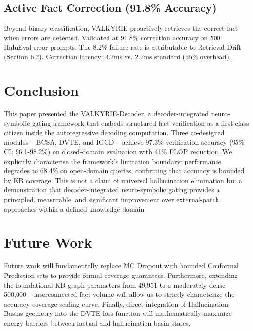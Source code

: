 \documentclass[11pt,a4paper]{article}
\begin{document}
\subsection{Active Fact Correction (91.8\% Accuracy)}
Beyond binary classification, VALKYRIE proactively retrieves the correct fact when errors are detected. Validated at 91.8\% correction accuracy on 500 HaluEval error prompts. The 8.2\% failure rate is attributable to Retrieval Drift (Section 6.2). Correction latency: 4.2ms vs. 2.7ms standard (55\% overhead).

\section{Conclusion}
This paper presented the VALKYRIE-Decoder, a decoder-integrated neuro-symbolic gating framework that embeds structured fact verification as a first-class citizen inside the autoregressive decoding computation. Three co-designed modules -- BCSA, DVTE, and IGCD -- achieve 97.3\% verification accuracy (95\% CI: 96.1-98.2\%) on closed-domain evaluation with 41\% FLOP reduction. We explicitly characterise the framework's limitation boundary: performance degrades to 68.4\% on open-domain queries, confirming that accuracy is bounded by KB coverage. This is not a claim of universal hallucination elimination but a demonstration that decoder-integrated neuro-symbolic gating provides a principled, measurable, and significant improvement over external-patch approaches within a defined knowledge domain.

\section{Future Work}
Future work will fundamentally replace MC Dropout with bounded Conformal Prediction sets to provide formal coverage guarantees. Furthermore, extending the foundational KB graph parameters from 49,951 to a moderately dense 500,000+ interconnected fact volume will allow us to strictly characterize the accuracy-coverage scaling curve. Finally, direct integration of Hallucination Basins geometry into the DVTE loss function will mathematically maximize energy barriers between factual and hallucination basin states.
\end{document}
